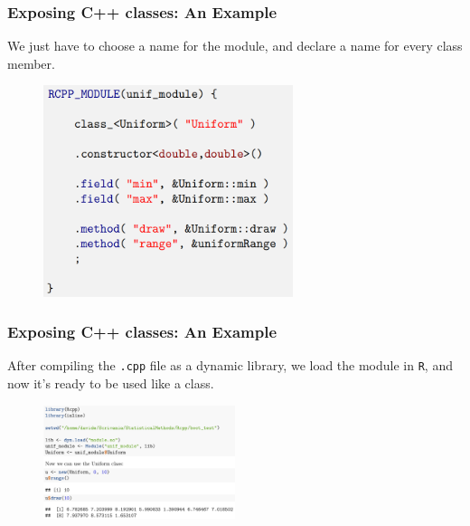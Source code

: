 \documentclass{beamer}
\def\code#1{\texttt{#1}} %
\begin{document}
\begin{frame}
\frametitle{Exposing C++ classes: An Example}
We just have to choose a name for the module, and declare a name for every class member.
\begin{figure}[s2]
    \includegraphics[width=0.65\textwidth]{exposing_classes_2.png}
\end{figure}
\end{frame}

\begin{frame}
\frametitle{Exposing C++ classes: An Example}
After compiling the \code{.cpp} file as a dynamic library, we load the module in \code{R}, and now it's ready to be used like a class.
\begin{figure}[s2]
    \includegraphics[width=0.5\textwidth]{exposing_classes_3.png}
\end{figure}
\end{frame}
\end{document}
